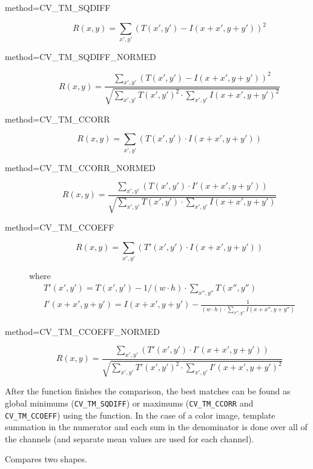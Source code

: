 \begin{description}
\item[method=CV\_TM\_SQDIFF]
\[ R(x,y)=\sum_{x',y'} (T(x',y')-I(x+x',y+y'))^2 \]

\item[method=CV\_TM\_SQDIFF\_NORMED]
\[ R(x,y)=\frac
{\sum_{x',y'} (T(x',y')-I(x+x',y+y'))^2}
{\sqrt{\sum_{x',y'}T(x',y')^2 \cdot \sum_{x',y'} I(x+x',y+y')^2}}
\]

\item[method=CV\_TM\_CCORR]
\[ R(x,y)=\sum_{x',y'} (T(x',y') \cdot I(x+x',y+y')) \]

\item[method=CV\_TM\_CCORR\_NORMED]
\[ R(x,y)=\frac
{\sum_{x',y'} (T(x',y') \cdot I'(x+x',y+y'))}
{\sqrt{\sum_{x',y'}T(x',y') \cdot \sum_{x',y'} I(x+x',y+y')}}
\]

\item[method=CV\_TM\_CCOEFF]
\[ R(x,y)=\sum_{x',y'} (T'(x',y') \cdot I(x+x',y+y')) \]

where
\[ 
\begin{array}{l}
T'(x',y')=T(x',y') - 1/(w \cdot h) \cdot \sum_{x'',y''} T(x'',y'')\\
I'(x+x',y+y')=I(x+x',y+y') - \frac{1}{(w \cdot h) \cdot \sum_{x'',y''} I(x+x'',y+y'')}
\end{array}
\]

\item[method=CV\_TM\_CCOEFF\_NORMED]
\[ R(x,y)=\frac
{ \sum_{x',y'} (T'(x',y') \cdot I'(x+x',y+y')) }
{ \sqrt{\sum_{x',y'}T'(x',y')^2 \cdot \sum_{x',y'} I'(x+x',y+y')^2} }
\]
\end{description}

After the function finishes the comparison, the best matches can be found as global minimums (\texttt{CV\_TM\_SQDIFF}) or maximums (\texttt{CV\_TM\_CCORR} and \texttt{CV\_TM\_CCOEFF}) using the  function. In the case of a color image, template summation in the numerator and each sum in the denominator is done over all of the channels (and separate mean values are used for each channel).

\label{MatchShapes}

Compares two shapes.


